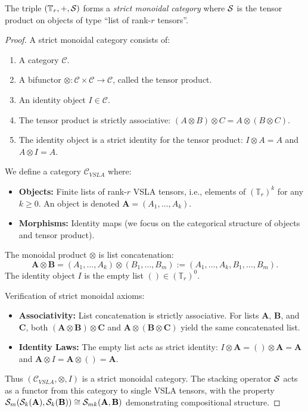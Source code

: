 \begin{proposition}
The triple $(\mathbb{T}_r, +, \mathcal{S})$ forms a \emph{strict monoidal category} where $\mathcal{S}$ is the tensor product on objects of type ``list of rank-$r$ tensors''.
\end{proposition}

\begin{proof}
A strict monoidal category consists of:
\begin{enumerate}
    \item A category $\mathcal{C}$.
    \item A bifunctor $\otimes: \mathcal{C} \times \mathcal{C} \to \mathcal{C}$, called the tensor product.
    \item An identity object $I \in \mathcal{C}$.
    \item The tensor product is strictly associative: $(A \otimes B) \otimes C = A \otimes (B \otimes C)$.
    \item The identity object is a strict identity for the tensor product: $I \otimes A = A$ and $A \otimes I = A$.
\end{enumerate}

We define a category $\mathcal{C}_{VSLA}$ where:
\begin{itemize}
    \item \textbf{Objects:} Finite lists of rank-$r$ VSLA tensors, i.e., elements of $(\mathbb{T}_r)^k$ for any $k \ge 0$. An object is denoted $\mathbf{A} = (A_1, \dots, A_k)$.
    \item \textbf{Morphisms:} Identity maps (we focus on the categorical structure of objects and tensor product).
\end{itemize}

The monoidal product $\otimes$ is list concatenation:
\[
    \mathbf{A} \otimes \mathbf{B} = (A_1, \dots, A_k) \otimes (B_1, \dots, B_m) := (A_1, \dots, A_k, B_1, \dots, B_m).
\]
The identity object $I$ is the empty list $() \in (\mathbb{T}_r)^0$.

Verification of strict monoidal axioms:
\begin{itemize}
    \item \textbf{Associativity:} List concatenation is strictly associative. For lists $\mathbf{A}$, $\mathbf{B}$, and $\mathbf{C}$, both $(\mathbf{A} \otimes \mathbf{B}) \otimes \mathbf{C}$ and $\mathbf{A} \otimes (\mathbf{B} \otimes \mathbf{C})$ yield the same concatenated list.
    \item \textbf{Identity Laws:} The empty list acts as strict identity: $I \otimes \mathbf{A} = () \otimes \mathbf{A} = \mathbf{A}$ and $\mathbf{A} \otimes I = \mathbf{A} \otimes () = \mathbf{A}$.
\end{itemize}

Thus $(\mathcal{C}_{VSLA}, \otimes, I)$ is a strict monoidal category. The stacking operator $\mathcal{S}$ acts as a functor from this category to single VSLA tensors, with the property $\mathcal{S}_m(\mathcal{S}_k(\mathbf{A}), \mathcal{S}_k(\mathbf{B})) \cong \mathcal{S}_{mk}(\mathbf{A}, \mathbf{B})$ demonstrating compositional structure.
\end{proof}

